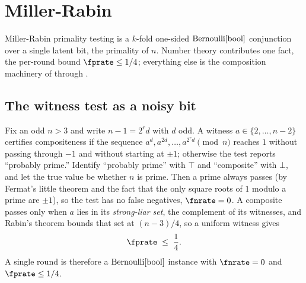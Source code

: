 %
%
%
%

\section{Miller-Rabin}
\label{sec:miller-rabin}

Miller-Rabin primality testing is a $k$-fold
one-sided $\mathrm{Bernoulli}[\mathrm{bool}]$ conjunction over a single latent bit, the
primality of $n$. Number theory contributes one fact, the per-round bound
$\fprate \le 1/4$; everything else is the composition machinery of
 through .

\subsection*{The witness test as a noisy bit}

Fix an odd $n > 3$ and write $n - 1 = 2^r d$ with $d$ odd. A witness $a \in
\{2, \ldots, n-2\}$ certifies compositeness if the sequence $a^d, a^{2d},
\ldots, a^{2^r d} \pmod{n}$ reaches $1$ without passing through $-1$ and
without starting at $\pm 1$; otherwise the test reports ``probably prime.''
Identify ``probably prime'' with $\top$ and ``composite'' with $\bot$, and let
the true value be whether $n$ is prime. Then a prime always passes (by Fermat's
little theorem and the fact that the only square roots of $1$ modulo a prime
are $\pm 1$), so the test has no false negatives, $\fnrate = 0$. A composite
passes only when $a$ lies in its \emph{strong-liar set}, the complement of
its witnesses, and Rabin's theorem
bounds that set at $(n-3)/4$, so a uniform witness gives
\begin{equation}
\label{eq:mr-fpr}
  \fprate \;\le\; \frac{1}{4}.
\end{equation}
A single round is therefore a $\mathrm{Bernoulli}[\mathrm{bool}]$ instance with $\fnrate =
0$ and $\fprate \le 1/4$.

